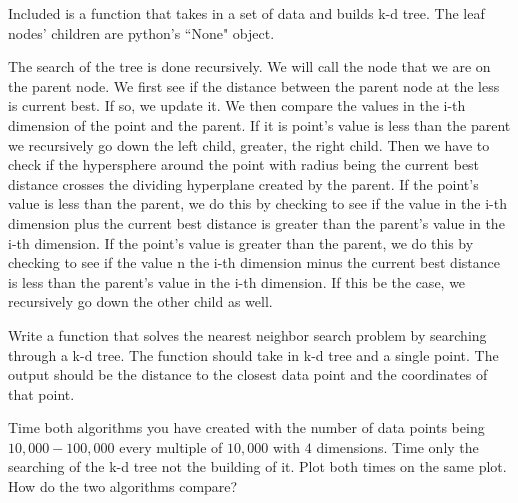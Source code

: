 Included is a function that takes in a set of data and builds k-d tree. The leaf nodes' children are  python's ``None" object.

The search of the tree is done recursively. We will call the node that we are on the parent node. We first see if the distance between the parent node at the less is current best. If so, we update it. We then compare the values in the i-th dimension of the point and the parent. If it is point's value is less than the parent we recursively go down the left child, greater, the right child. Then we have to check if the hypersphere around the point with radius being the current best distance crosses the dividing hyperplane created by the parent. If the point's value is less than the parent, we do this by checking to see if the value in the i-th dimension plus the current best distance is greater than the parent's value in the i-th dimension. If the point's value is greater than the parent, we do this by checking to see if the value n the i-th dimension minus the current best distance is less than the parent's value in the i-th dimension. If this be the case, we recursively go down the other child as well.

\begin{problem}
Write a function that solves the nearest neighbor search problem by searching through a k-d tree. The function should take in k-d tree and a single point. The output should be the distance to the closest data point and the coordinates of that point. 
\end{problem}

\begin{problem}
Time both algorithms you have created with the number of data points being $10,000-100,000$ every multiple of $10,000$ with $4$ dimensions. Time only the searching of the k-d tree not the building of it. Plot both times on the same plot. How do the two algorithms compare?
\end{problem}

